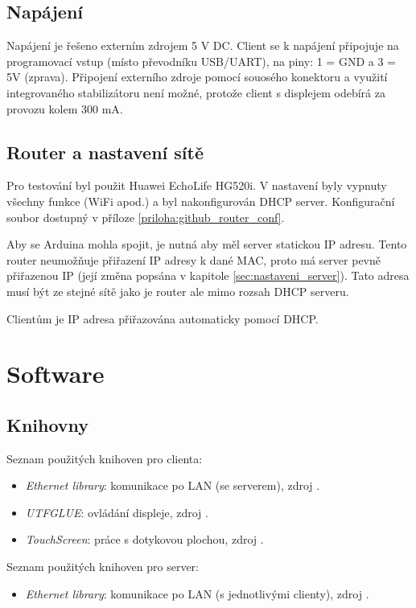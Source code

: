 \documentclass[a4paper,12pt, twoside]{article} %
\begin{document}
\subsection{Napájení}
\label{sec:napajeni}
Napájení je řešeno externím zdrojem 5 V DC. Client se k napájení připojuje na programovací vstup (místo převodníku USB/UART), na piny: 1 = GND a 3 = 5V (zprava). Připojení externího zdroje pomocí souosého konektoru a využití integrovaného stabilizátoru není možné, protože client s displejem odebírá za provozu kolem 300 mA. 
\subsection{Router a nastavení sítě}
\label{sec:router}
Pro testování byl použit Huawei EchoLife HG520i. V nastavení byly vypnuty všechny funkce (WiFi apod.) a byl nakonfigurován DHCP server. Konfigurační soubor dostupný v příloze \ref{priloha:github_router_conf}.

Aby se Arduina mohla spojit, je nutná aby měl server statickou IP adresu. Tento router neumožňuje přiřazení IP adresy k dané MAC, proto má server pevně přiřazenou IP (její změna popsána v kapitole \ref{sec:nastaveni_server}). Tato adresa musí být ze stejné sítě jako je router ale mimo rozsah DHCP serveru.

Clientům je IP adresa přiřazována automaticky pomocí DHCP.
\clearpage
\section{Software}
\subsection{Knihovny}
\label{sec:knihovny}
Seznam použitých knihoven pro clienta:
\begin{itemize}
\item \textit{Ethernet library}: komunikace po LAN (se serverem), zdroj \cite{library_ethernet}.
\item \textit{UTFGLUE}: ovládání displeje, zdroj \cite{library_UTFGLUE}.
\item \textit{TouchScreen}: práce s dotykovou plochou, zdroj  \cite{library_touch}.
\end{itemize}

Seznam použitých knihoven pro server:
\begin{itemize}
\item \textit{Ethernet library}: komunikace po LAN (s jednotlivými clienty), zdroj \cite{library_ethernet}.
\end{itemize}
\end{document}
